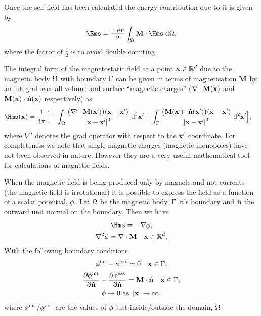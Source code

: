 Once the self field has been calculated the energy contribution due to it is given by
\begin{equation}
  \label{eq:41}
  \Ems =  \frac{-\mu_0}{2} \int_{\magd} \Mv \cdot \Hms \d \magd,
\end{equation}
where the factor of $\frac{1}{2}$ is to avoid double counting.

The integral form of the magnetostatic field at a point $\mathbf{x} \in \mathbb{R}^d$ due to the magnetic body $\Omega$ with boundary ${\Gamma}$ can be given in terms of magnetisation $\mathbf{M}$ by an integral over all volume and surface ``magnetic charges'' ($\nabla \cdot \mathbf{M}(\mathbf{x})$ and $\mathbf{M}(\mathbf{x}) \cdot \mathbf{\hat{n}}(\mathbf{x})$ respectively) as
\begin{align}
  \Hms(\xv) &= \frac{1}{4 \pi} \Big[ - \int_\magd \frac{\big( \nabla' \cdot \Mv(\xv') \big)(\xv - \xv')}{\abs{ \xv -\xv'}^3} \d^3 \xv'
              + \int_\boundd \frac{ \big( \Mv(\xv') \cdot \nv(\xv') \big) (\xv - \xv')}{\abs{\xv - \xv'}^3} \d^2 \xv' \Big],
              \label{eq:Hmsint}
\end{align}
where $\nabla'$ denotes the grad operator with respect to the $\mathbf{x}'$ coordinate.
For completeness we note that single magnetic charges (magnetic monopoles) have not been observed in nature.
However they are a very useful mathematical tool for calculations of magnetic fields.



When the magnetic field is being produced only by magnets and not currents (\ie the magnetic field is irrotational) it is possible to express the field as a function of a scalar potential, $\phi$.\cite{Coey2010}
Let $\Omega$ be the magnetic body, ${\Gamma}$ it's boundary and $\mathbf{\hat{n}}$ the outward unit normal on the boundary.
Then we have
\begin{gather}
  \Hms = - \nabla \phim,  \label{eq:Hms} \\
  \lap \phim = \nabla \cdot \Mv \quad \xv \in \fulld, \label{eq:nnphim}
\end{gather}
With the following boundary conditions
\begin{gather}
  \phi^{\text{int}} - \phi^{\text{ext}} = 0 \quad \mathbf{x} \in {\Gamma}, \label{eq:cont-phi-bound} \\
  \frac{\partial \phi^{\text{int}}}{\partial \mathbf{\hat{n}}} - \frac{\partial \phi^{\text{ext}}}{\partial \mathbf{\hat{n}}} = \mathbf{M} \cdot \mathbf{\hat{n}} \quad \mathbf{x} \in {\Gamma},
  \label{eq:nndphidn-bound} \\
  \phi \rightarrow 0 \text{ as } \left|{\mathbf{x}} \right| \rightarrow \infty, \label{eq:phi-inf}
\end{gather}
where $\phi^{\text{int}}$/$\phi^{\text{ext}}$ are the values of $\phi$ just inside/outside the domain, $\Omega$.


